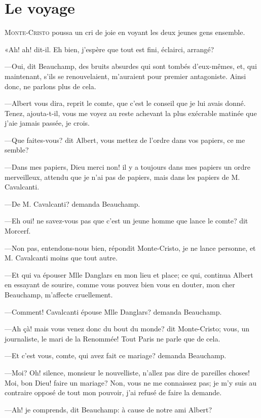 \chapter{Le voyage}

\lettrine{M}{onte-Cristo} poussa un cri de joie en voyant les deux jeunes gens ensemble. 

\zz
«Ah! ah! dit-il. Eh bien, j'espère que tout est fini, éclairci, arrangé? 

—Oui, dit Beauchamp, des bruits absurdes qui sont tombés d'eux-mêmes, et, qui maintenant, s'ils se renouvelaient, m'auraient pour premier antagoniste. Ainsi donc, ne parlons plus de cela. 

—Albert vous dira, reprit le comte, que c'est le conseil que je lui avais donné. Tenez, ajouta-t-il, vous me voyez au reste achevant la plus exécrable matinée que j'aie jamais passée, je crois. 

—Que faites-vous? dit Albert, vous mettez de l'ordre dans vos papiers, ce me semble? 

—Dans mes papiers, Dieu merci non! il y a toujours dans mes papiers un ordre merveilleux, attendu que je n'ai pas de papiers, mais dans les papiers de M. Cavalcanti. 

—De M. Cavalcanti? demanda Beauchamp. 

—Eh oui! ne savez-vous pas que c'est un jeune homme que lance le comte? dit Morcerf. 

—Non pas, entendons-nous bien, répondit Monte-Cristo, je ne lance personne, et M. Cavalcanti moins que tout autre. 

—Et qui va épouser Mlle Danglars en mon lieu et place; ce qui, continua Albert en essayant de sourire, comme vous pouvez bien vous en douter, mon cher Beauchamp, m'affecte cruellement. 

—Comment! Cavalcanti épouse Mlle Danglars? demanda Beauchamp. 

—Ah çà! mais vous venez donc du bout du monde? dit Monte-Cristo; vous, un journaliste, le mari de la Renommée! Tout Paris ne parle que de cela. 

—Et c'est vous, comte, qui avez fait ce mariage? demanda Beauchamp. 

—Moi? Oh! silence, monsieur le nouvelliste, n'allez pas dire de pareilles choses! Moi, bon Dieu! faire un mariage? Non, vous ne me connaissez pas; je m'y suis au contraire opposé de tout mon pouvoir, j'ai refusé de faire la demande. 

—Ah! je comprends, dit Beauchamp: à cause de notre ami Albert? 

